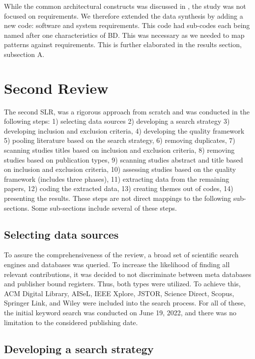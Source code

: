 \documentclass[a4paper,11pt,article,oneside]{memoir}
\begin{document}
While the common architectural constructs was discussed in \cite{Ataei.2020}, the study was not focused on requirements. We therefore extended the data synthesis by adding a new code: software and system requirements. This code had sub-codes each being named after one characteristics of BD. This was necessary as we needed to map patterns against requirements. This is further elaborated in the results section, subsection A.

\section{Second Review}

The second SLR, was a rigorous approach from scratch and was conducted in the following steps: 1) selecting data sources 2) developing a search strategy 3) developing inclusion and exclusion criteria, 4) developing the quality framework 5) pooling literature based on the search strategy, 6) removing duplicates, 7) scanning studies titles based on inclusion and exclusion criteria, 8) removing studies based on publication types, 9) scanning studies abstract and title based on inclusion and exclusion criteria, 10) assessing studies based on the quality framework (includes three phases), 11) extracting data from the remaining papers, 12) coding the extracted data, 13) creating themes out of codes, 14) presenting the results. These steps are not direct mappings to the following sub-sections. Some sub-sections include several of these steps.


\subsection{Selecting data sources}

To assure the comprehensiveness of the review, a broad set of scientific search engines and databases was queried. To increase the likelihood of finding all relevant contributions, it was decided to not discriminate between meta databases and publisher bound registers. Thus, both types were utilized. To achieve this, ACM Digital Library, AISeL, IEEE Xplore, JSTOR, Science Direct, Scopus, Springer Link, and Wiley were included into the search process. For all of these, the initial keyword search was conducted on June 19, 2022, and there was no limitation to the considered publishing date.

\subsection{Developing a search strategy}
\end{document}
